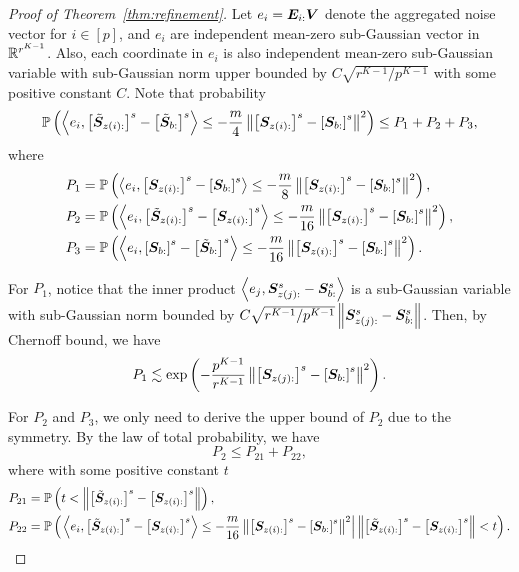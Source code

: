 \documentclass[lettersize,journal]{IEEEtran}
\theoremstyle{definition}
\theoremstyle{definition}
\newcommand{\of}[1]{\left(#1\right)}
\newcommand{\off}[1]{\left[#1\right]}
\newcommand{\ang}[1]{\left\langle#1\right\rangle}
\def\fixme#1#2{\textbf{\color{red}[FIXME (#1): #2]}}
\begin{document}
\begin{proof}[Proof of Theorem~\ref{thm:refinement}]
    Let $e_i = \bm{E}_{i:} \bm{V}$ denote the aggregated noise vector for $i \in [p]$, and $e_i$ are independent mean-zero sub-Gaussian vector in $\mathbb{R}^{r^{K-1}}$. Also, each coordinate in $e_i$ is also independent mean-zero sub-Gaussian variable with sub-Gaussian norm upper bounded by $C\sqrt{r^{K-1}/p^{K-1}}$ with some positive constant $C$.
    Note that probability 
    \begin{align}
        \bbP \of{ \ang{ e_i, \off{  \tilde \mS_{z(i):} }^s - \off{  \tilde \mS_{b:} }^s }  \leq - \frac{ m}{4} \onorm{ \off{ \mS_{z(i):}  }^s - \off{ \mS_{b:}  }^s  }^2} \leq P_1 + P_2 + P_3,
    \end{align}
    where 
    \begin{align}
        P_1 &= \bbP \of{ \ang{e_i, \off{  \mS_{z(i):} }^s - \off{ \mS_{b:} }^s} \leq -\frac{m}{8}  \onorm{ \off{ \mS_{z(i):}  }^s - \off{ \mS_{b:}  }^s  }^2 }, \\
        P_2 &= \bbP \of{ \ang{e_i, \off{ \tilde  \mS_{z(i):} }^s - \off{ \mS_{z(i):} }^s} \leq -\frac{m}{16}  \onorm{ \off{ \mS_{z(i):}  }^s - \off{ \mS_{b:}  }^s  }^2 },\\
        P_3 &= \bbP \of{ \ang{e_i, \off{  \mS_{b:} }^s - \off{\tilde  \mS_{b:} }^s} \leq -\frac{m}{16}   \onorm{ \off{ \mS_{z(i):}  }^s - \off{ \mS_{b:}  }^s  }^2 }.
    \end{align}
    
    For $P_1$, notice that the inner product $\ang{e_j,\mS_{z(j):}^s - \mS_{b:}^s} $ is a sub-Gaussian variable with sub-Gaussian norm bounded by $C \sqrt{ r^{K-1}/ p^{K-1} } \left\lVert \bm S_{z(j):} ^s -  \bm S_{b:}^s \right\rVert$. Then, by Chernoff bound, we have  
    \begin{equation}\label{eq:p1_2}
         P_1 \lesssim \exp \of{  - \frac{p^{K-1}}{r^{K-1}}   \onorm{ \off{ \mS_{z(j):}  }^s - \off{ \mS_{b:}  }^s  }^2 }.
    \end{equation}
    
    For $P_2$ and $P_3$, we only need to derive the upper bound of $P_2$ due to the symmetry. By the law of total probability, we have 
    \begin{equation}\label{eq:p2}
        P_2 \leq P_{21} + P_{22},
    \end{equation}
    where with some positive constant $t$
    \begin{align}
        P_{21}& =  \bbP \of{ t <   \onorm{ \off{ \tilde  \mS_{z(i):} }^s - \off{ \mS_{z(i):} }^s }},\\
        P_{22} &= \bbP \of{ \left. \ang{e_i, \off{ \tilde  \mS_{z(i):} }^s - \off{ \mS_{z(i):} }^s} \leq -\frac{m}{16}  \onorm{ \off{ \mS_{z(i):}  }^s - \off{ \mS_{b:}  }^s  }^2 \right| \onorm{ \off{ \tilde  \mS_{z(i):} }^s - \off{ \mS_{z(i):} }^s } < t  }.
    \end{align}
    

\end{proof}
\end{document}
